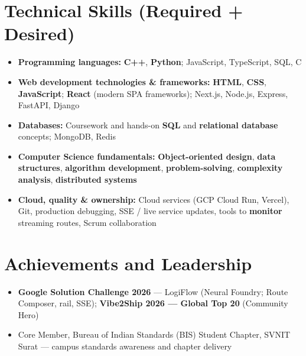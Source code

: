 \documentclass[a4paper,10pt]{article}
\begin{document}
\section{Technical Skills (Required + Desired)}
\small
\begin{itemize}[label={}]
  \item \textbf{Programming languages:} \textbf{C++}, \textbf{Python}; JavaScript, TypeScript, SQL, C
  \item \textbf{Web development technologies \& frameworks:} \textbf{HTML}, \textbf{CSS}, \textbf{JavaScript}; \textbf{React} (modern SPA frameworks); Next.js, Node.js, Express, FastAPI, Django
  \item \textbf{Databases:} Coursework and hands-on \textbf{SQL} and \textbf{relational database} concepts; MongoDB, Redis
  \item \textbf{Computer Science fundamentals:} \textbf{Object-oriented design}, \textbf{data structures}, \textbf{algorithm development}, \textbf{problem-solving}, \textbf{complexity analysis}, \textbf{distributed systems}
  \item \textbf{Cloud, quality \& ownership:} Cloud services (GCP Cloud Run, Vercel), Git, production debugging, SSE / live service updates, tools to \textbf{monitor} streaming routes, Scrum collaboration
\end{itemize}

\section{Achievements and Leadership}
\small
\begin{itemize}
  \item \textbf{Google Solution Challenge 2026} --- LogiFlow (Neural Foundry; Route Composer, rail, SSE); \textbf{Vibe2Ship 2026 --- Global Top 20} (Community Hero)
  \item Core Member, Bureau of Indian Standards (BIS) Student Chapter, SVNIT Surat --- campus standards awareness and chapter delivery
\end{itemize}
\end{document}
